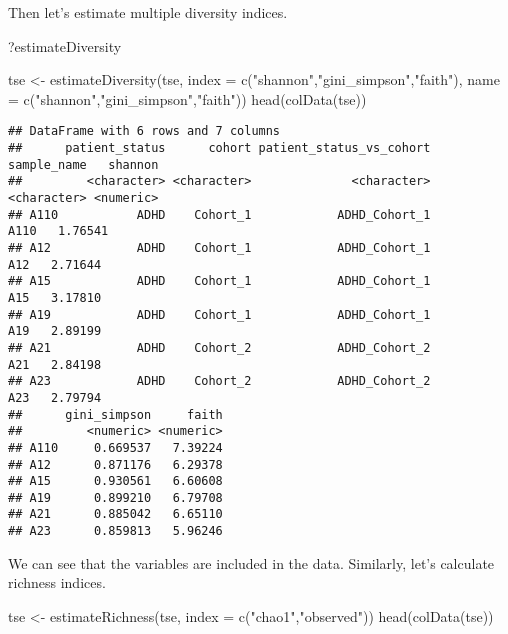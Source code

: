 \documentclass[
  oneside]{book}
\newenvironment{Shaded}{\begin{snugshade}}{\end{snugshade}}
\newcommand{\AttributeTok}[1]{\textcolor[rgb]{0.77,0.63,0.00}{#1}}
\newcommand{\FunctionTok}[1]{\textcolor[rgb]{0.00,0.00,0.00}{#1}}
\newcommand{\NormalTok}[1]{#1}
\newcommand{\OtherTok}[1]{\textcolor[rgb]{0.56,0.35,0.01}{#1}}
\newcommand{\StringTok}[1]{\textcolor[rgb]{0.31,0.60,0.02}{#1}}
\begin{document}
Then let's estimate multiple diversity indices.

\begin{Shaded}
\begin{Highlighting}[]
\NormalTok{?estimateDiversity}

\NormalTok{tse }\OtherTok{\textless{}{-}} \FunctionTok{estimateDiversity}\NormalTok{(tse, }
                              \AttributeTok{index =} \FunctionTok{c}\NormalTok{(}\StringTok{"shannon"}\NormalTok{,}\StringTok{"gini\_simpson"}\NormalTok{,}\StringTok{"faith"}\NormalTok{),}
                              \AttributeTok{name =} \FunctionTok{c}\NormalTok{(}\StringTok{"shannon"}\NormalTok{,}\StringTok{"gini\_simpson"}\NormalTok{,}\StringTok{"faith"}\NormalTok{))}
\FunctionTok{head}\NormalTok{(}\FunctionTok{colData}\NormalTok{(tse))}
\end{Highlighting}
\end{Shaded}

\begin{verbatim}
## DataFrame with 6 rows and 7 columns
##      patient_status      cohort patient_status_vs_cohort sample_name   shannon
##         <character> <character>              <character> <character> <numeric>
## A110           ADHD    Cohort_1            ADHD_Cohort_1        A110   1.76541
## A12            ADHD    Cohort_1            ADHD_Cohort_1         A12   2.71644
## A15            ADHD    Cohort_1            ADHD_Cohort_1         A15   3.17810
## A19            ADHD    Cohort_1            ADHD_Cohort_1         A19   2.89199
## A21            ADHD    Cohort_2            ADHD_Cohort_2         A21   2.84198
## A23            ADHD    Cohort_2            ADHD_Cohort_2         A23   2.79794
##      gini_simpson     faith
##         <numeric> <numeric>
## A110     0.669537   7.39224
## A12      0.871176   6.29378
## A15      0.930561   6.60608
## A19      0.899210   6.79708
## A21      0.885042   6.65110
## A23      0.859813   5.96246
\end{verbatim}

We can see that the variables are included in the data.
Similarly, let's calculate richness indices.

\begin{Shaded}
\begin{Highlighting}[]
\NormalTok{tse }\OtherTok{\textless{}{-}} \FunctionTok{estimateRichness}\NormalTok{(tse, }
                              \AttributeTok{index =} \FunctionTok{c}\NormalTok{(}\StringTok{"chao1"}\NormalTok{,}\StringTok{"observed"}\NormalTok{))}
\FunctionTok{head}\NormalTok{(}\FunctionTok{colData}\NormalTok{(tse))}
\end{Highlighting}
\end{Shaded}
\end{document}
